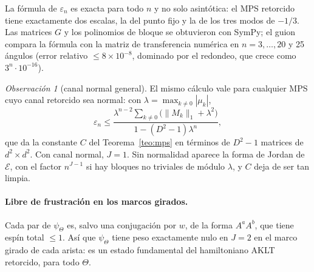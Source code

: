 \documentclass[11pt,a4paper]{article}
\theoremstyle{remark}
\newtheorem*{observacion}{Observación}
\begin{document}
La fórmula de $\varepsilon_n$ es exacta para todo $n$ y no solo asintótica: el MPS retorcido tiene
exactamente dos escalas, la del punto fijo y la de los tres modos de $-1/3$. Las matrices $G$ y
los polinomios de bloque se obtuvieron con SymPy; el guion compara la fórmula con la matriz de
transferencia numérica en $n=3,\dots,20$ y 25 ángulos (error relativo $\le8\times10^{-8}$,
dominado por el redondeo, que crece como $3^n\cdot10^{-16}$).

\begin{observacion}[canal normal general]
El mismo cálculo vale para cualquier MPS cuyo canal retorcido sea normal: con $\lambda=\max_{k\ne0}
|\mu_k|$,
\[
  \varepsilon_n\le\frac{\lambda^{n-2}\sum_{k\neq0}\big(\|M_k\|_1+\lambda^2\big)}{1-(D^2-1)\lambda^n},
\]
que da la constante $C$ del Teorema~\ref{teo:mps} en términos de $D^2-1$ matrices de $d^2\times d^2$.
Con canal normal, $J=1$. Sin normalidad aparece la forma de Jordan de $\mathcal E$, con el factor
$n^{J-1}$ si hay bloques no triviales de módulo $\lambda$, y $C$ deja de ser tan limpia.
\end{observacion}

\paragraph{Libre de frustración en los marcos girados.} Cada par de $\psi_\Theta$ es, salvo una
conjugación por $w$, de la forma $A^aA^b$, que tiene espín total $\le1$. Así que $\psi_\Theta$ tiene
peso exactamente nulo en $J=2$ en el marco girado de cada arista: es un estado fundamental del
hamiltoniano AKLT retorcido, para todo $\Theta$.
\end{document}
